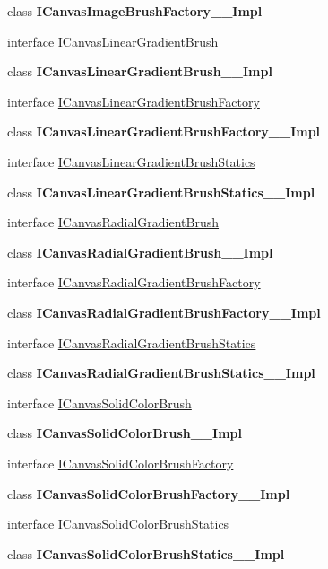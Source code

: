 \begin{DoxyCompactItemize}
\item 
class {\bfseries I\+Canvas\+Image\+Brush\+Factory\+\_\+\+\_\+\+Impl}
\item 
interface \hyperlink{interface_microsoft_1_1_graphics_1_1_canvas_1_1_brushes_1_1_i_canvas_linear_gradient_brush}{I\+Canvas\+Linear\+Gradient\+Brush}
\item 
class {\bfseries I\+Canvas\+Linear\+Gradient\+Brush\+\_\+\+\_\+\+Impl}
\item 
interface \hyperlink{interface_microsoft_1_1_graphics_1_1_canvas_1_1_brushes_1_1_i_canvas_linear_gradient_brush_factory}{I\+Canvas\+Linear\+Gradient\+Brush\+Factory}
\item 
class {\bfseries I\+Canvas\+Linear\+Gradient\+Brush\+Factory\+\_\+\+\_\+\+Impl}
\item 
interface \hyperlink{interface_microsoft_1_1_graphics_1_1_canvas_1_1_brushes_1_1_i_canvas_linear_gradient_brush_statics}{I\+Canvas\+Linear\+Gradient\+Brush\+Statics}
\item 
class {\bfseries I\+Canvas\+Linear\+Gradient\+Brush\+Statics\+\_\+\+\_\+\+Impl}
\item 
interface \hyperlink{interface_microsoft_1_1_graphics_1_1_canvas_1_1_brushes_1_1_i_canvas_radial_gradient_brush}{I\+Canvas\+Radial\+Gradient\+Brush}
\item 
class {\bfseries I\+Canvas\+Radial\+Gradient\+Brush\+\_\+\+\_\+\+Impl}
\item 
interface \hyperlink{interface_microsoft_1_1_graphics_1_1_canvas_1_1_brushes_1_1_i_canvas_radial_gradient_brush_factory}{I\+Canvas\+Radial\+Gradient\+Brush\+Factory}
\item 
class {\bfseries I\+Canvas\+Radial\+Gradient\+Brush\+Factory\+\_\+\+\_\+\+Impl}
\item 
interface \hyperlink{interface_microsoft_1_1_graphics_1_1_canvas_1_1_brushes_1_1_i_canvas_radial_gradient_brush_statics}{I\+Canvas\+Radial\+Gradient\+Brush\+Statics}
\item 
class {\bfseries I\+Canvas\+Radial\+Gradient\+Brush\+Statics\+\_\+\+\_\+\+Impl}
\item 
interface \hyperlink{interface_microsoft_1_1_graphics_1_1_canvas_1_1_brushes_1_1_i_canvas_solid_color_brush}{I\+Canvas\+Solid\+Color\+Brush}
\item 
class {\bfseries I\+Canvas\+Solid\+Color\+Brush\+\_\+\+\_\+\+Impl}
\item 
interface \hyperlink{interface_microsoft_1_1_graphics_1_1_canvas_1_1_brushes_1_1_i_canvas_solid_color_brush_factory}{I\+Canvas\+Solid\+Color\+Brush\+Factory}
\item 
class {\bfseries I\+Canvas\+Solid\+Color\+Brush\+Factory\+\_\+\+\_\+\+Impl}
\item 
interface \hyperlink{interface_microsoft_1_1_graphics_1_1_canvas_1_1_brushes_1_1_i_canvas_solid_color_brush_statics}{I\+Canvas\+Solid\+Color\+Brush\+Statics}
\item 
class {\bfseries I\+Canvas\+Solid\+Color\+Brush\+Statics\+\_\+\+\_\+\+Impl}
\end{DoxyCompactItemize}
